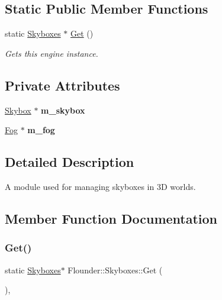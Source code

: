 \subsection*{Static Public Member Functions}
\begin{DoxyCompactItemize}
\item 
static \hyperlink{class_flounder_1_1_skyboxes}{Skyboxes} $\ast$ \hyperlink{class_flounder_1_1_skyboxes_ab46fe875f84a3d620903dc72a6a488f1}{Get} ()
\begin{DoxyCompactList}\small\item\em Gets this engine instance. \end{DoxyCompactList}\end{DoxyCompactItemize}
\subsection*{Private Attributes}
\begin{DoxyCompactItemize}
\item 
\mbox{\label{class_flounder_1_1_skyboxes_a001da5d5fa1e8bdbab64496983449392}} 
\hyperlink{class_flounder_1_1_skybox}{Skybox} $\ast$ {\bfseries m\+\_\+skybox}
\item 
\mbox{\label{class_flounder_1_1_skyboxes_a29c72ab14ecb50110dd32595205df491}} 
\hyperlink{class_flounder_1_1_fog}{Fog} $\ast$ {\bfseries m\+\_\+fog}
\end{DoxyCompactItemize}


\subsection{Detailed Description}
A module used for managing skyboxes in 3D worlds. 



\subsection{Member Function Documentation}
\mbox{\label{class_flounder_1_1_skyboxes_ab46fe875f84a3d620903dc72a6a488f1}} 
\subsubsection{\texorpdfstring{Get()}{Get()}}
{\footnotesize\ttfamily static \hyperlink{class_flounder_1_1_skyboxes}{Skyboxes}$\ast$ Flounder\+::\+Skyboxes\+::\+Get (\begin{DoxyParamCaption}{ }\end{DoxyParamCaption})\hspace{0.3cm}{\ttfamily [inline]}, {\ttfamily [static]}}



